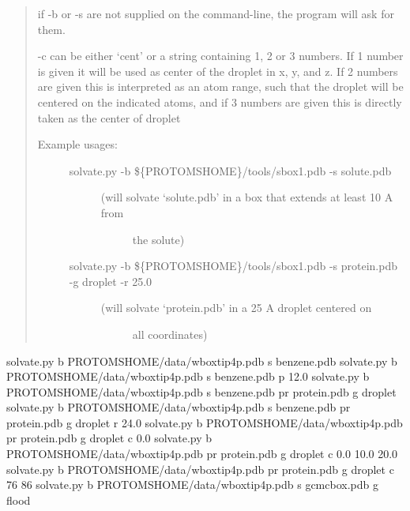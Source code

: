 \documentclass[letterpaper,10pt,english]{sphinxmanual}
\begin{document}
\begin{quote}

if -b or -s are not supplied on the command-line, the program will ask for
them.

-c can be either ‘cent’ or a string containing 1, 2 or 3 numbers. If 1
number is given it will be used as center of the droplet in x, y, and z.
If 2 numbers are given this is interpreted as an atom range, such that the
droplet will be centered on the indicated atoms, and if 3 numbers are
given this is directly taken as the center of droplet
\begin{description}
\item[{Example usages:}] \leavevmode\begin{description}
\item[{solvate.py -b \$\{PROTOMSHOME\}/tools/sbox1.pdb -s solute.pdb}] \leavevmode\begin{description}
\item[{(will solvate ‘solute.pdb’ in a box that extends at least 10 A from}] \leavevmode
the solute)

\end{description}

\item[{solvate.py -b \$\{PROTOMSHOME\}/tools/sbox1.pdb -s protein.pdb -g droplet -r 25.0}] \leavevmode\begin{description}
\item[{(will solvate ‘protein.pdb’ in a 25 A droplet centered on}] \leavevmode
all coordinates)

\end{description}

\end{description}

\end{description}
\end{quote}



%
\begin{sphinxVerbatim}[commandchars=\\\{\}]
solvate.py \PYGZhy{}b \PYGZdl{}PROTOMSHOME/data/wbox\PYGZus{}tip4p.pdb \PYGZhy{}s benzene.pdb
solvate.py \PYGZhy{}b \PYGZdl{}PROTOMSHOME/data/wbox\PYGZus{}tip4p.pdb \PYGZhy{}s benzene.pdb \PYGZhy{}p 12.0
solvate.py \PYGZhy{}b \PYGZdl{}PROTOMSHOME/data/wbox\PYGZus{}tip4p.pdb \PYGZhy{}s benzene.pdb \PYGZhy{}pr protein.pdb \PYGZhy{}g droplet
solvate.py \PYGZhy{}b \PYGZdl{}PROTOMSHOME/data/wbox\PYGZus{}tip4p.pdb \PYGZhy{}s benzene.pdb \PYGZhy{}pr protein.pdb \PYGZhy{}g droplet \PYGZhy{}r 24.0
solvate.py \PYGZhy{}b \PYGZdl{}PROTOMSHOME/data/wbox\PYGZus{}tip4p.pdb \PYGZhy{}pr protein.pdb \PYGZhy{}g droplet \PYGZhy{}c 0.0
solvate.py \PYGZhy{}b \PYGZdl{}PROTOMSHOME/data/wbox\PYGZus{}tip4p.pdb \PYGZhy{}pr protein.pdb \PYGZhy{}g droplet \PYGZhy{}c \PYGZdq{}0.0 10.0 20.0\PYGZdq{}
solvate.py \PYGZhy{}b \PYGZdl{}PROTOMSHOME/data/wbox\PYGZus{}tip4p.pdb \PYGZhy{}pr protein.pdb \PYGZhy{}g droplet \PYGZhy{}c \PYGZdq{}76 86\PYGZdq{}
solvate.py \PYGZhy{}b \PYGZdl{}PROTOMSHOME/data/wbox\PYGZus{}tip4p.pdb \PYGZhy{}s gcmc\PYGZus{}box.pdb \PYGZhy{}g flood
\end{sphinxVerbatim}
\end{document}
